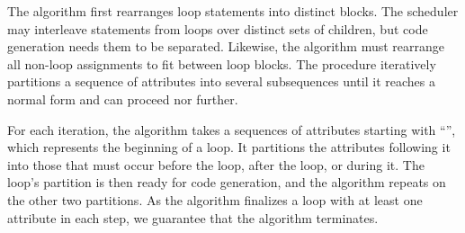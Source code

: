 The algorithm first rearranges loop statements into distinct blocks. The scheduler may interleave statements from loops over distinct sets of children, but code generation needs them to be separated.  Likewise, the algorithm must rearrange all non-loop assignments to fit between loop blocks. The procedure iteratively partitions a sequence of attributes into several subsequences until it reaches a normal form and can proceed nor further.

For each iteration, the algorithm takes a sequences of attributes starting with ``'', which represents the beginning of a loop. It partitions the attributes following it into those that must occur before the loop, after the loop, or during it. The loop's partition is then ready for code generation, and the algorithm repeats on the other two partitions. As the algorithm finalizes a loop with at least one attribute in each step, we guarantee that the algorithm terminates.

